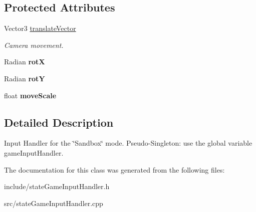 \subsection*{\-Protected \-Attributes}
\begin{DoxyCompactItemize}
\item 
\hypertarget{classGameInputHandler_a628c8fc247bf2748880476c3944a1201}{
\-Vector3 \hyperlink{classGameInputHandler_a628c8fc247bf2748880476c3944a1201}{translate\-Vector}}
\label{dc/d26/classGameInputHandler_a628c8fc247bf2748880476c3944a1201}

\begin{DoxyCompactList}\small\item\em \-Camera movement. \end{DoxyCompactList}\item 
\hypertarget{classGameInputHandler_a5f3620a1cab5457a55f0f899173947a4}{
\-Radian {\bfseries rot\-X}}
\label{dc/d26/classGameInputHandler_a5f3620a1cab5457a55f0f899173947a4}

\item 
\hypertarget{classGameInputHandler_ac25a2f5df89bb5db999d07aeec9177fc}{
\-Radian {\bfseries rot\-Y}}
\label{dc/d26/classGameInputHandler_ac25a2f5df89bb5db999d07aeec9177fc}

\item 
\hypertarget{classGameInputHandler_ae9fd9f0e39eaa0570cff9fb83384c081}{
float {\bfseries move\-Scale}}
\label{dc/d26/classGameInputHandler_ae9fd9f0e39eaa0570cff9fb83384c081}

\end{DoxyCompactItemize}


\subsection{\-Detailed \-Description}
\-Input \-Handler for the \char`\"{}\-Sandbox\char`\"{} mode. \-Pseudo-\/\-Singleton\-: use the global variable game\-Input\-Handler. 

\-The documentation for this class was generated from the following files\-:\begin{DoxyCompactItemize}
\item 
include/state\-Game\-Input\-Handler.\-h\item 
src/state\-Game\-Input\-Handler.\-cpp\end{DoxyCompactItemize}
